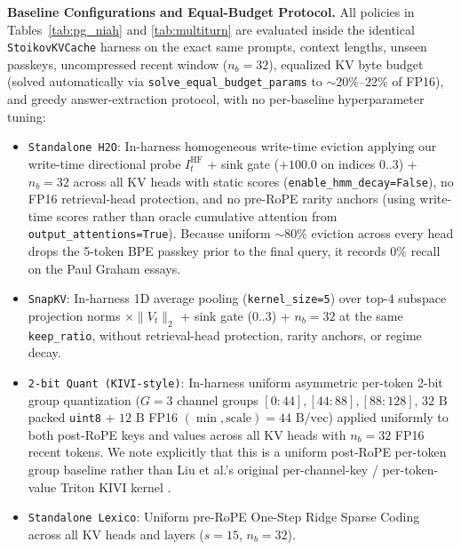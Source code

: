 \documentclass[conference]{IEEEtran}
\begin{document}
\textbf{Baseline Configurations and Equal-Budget Protocol.} All policies in Tables~\ref{tab:pg_niah} and \ref{tab:multiturn} are evaluated inside the identical \texttt{StoikovKVCache} harness on the exact same prompts, context lengths, unseen passkeys, uncompressed recent window ($n_b = 32$), equalized KV byte budget (solved automatically via \texttt{solve\_equal\_budget\_params} to $\sim 20\%$--$22\%$ of FP16), and greedy answer-extraction protocol, with no per-baseline hyperparameter tuning:
\begin{itemize}
    \item \texttt{Standalone H2O}: In-harness homogeneous write-time eviction applying our write-time directional probe $I_t^{\text{HF}}$ + sink gate ($+100.0$ on indices $0..3$) + $n_b = 32$ across all KV heads with static scores (\texttt{enable\_hmm\_decay=False}), no FP16 retrieval-head protection, and no pre-RoPE rarity anchors (using write-time scores rather than oracle cumulative attention from \texttt{output\_attentions=True}). Because uniform $\sim 80\%$ eviction across every head drops the 5-token BPE passkey prior to the final query, it records $0\%$ recall on the Paul Graham essays.
    \item \texttt{SnapKV}: In-harness 1D average pooling (\texttt{kernel\_size=5}) over top-$4$ subspace projection norms $\times \|V_t\|_2$ + sink gate ($0..3$) + $n_b = 32$ at the same \texttt{keep\_ratio}, without retrieval-head protection, rarity anchors, or regime decay.
    \item \texttt{2-bit Quant (KIVI-style)}: In-harness uniform asymmetric per-token 2-bit group quantization ($G = 3$ channel groups $[0{:}44], [44{:}88], [88{:}128]$, $32\text{ B}$ packed \texttt{uint8} + $12\text{ B}$ FP16 $(\min, \text{scale}) = 44\text{ B/vec}$) applied uniformly to both post-RoPE keys and values across all KV heads with $n_b = 32$ FP16 recent tokens. We note explicitly that this is a uniform post-RoPE per-token group baseline rather than Liu et al.'s original per-channel-key / per-token-value Triton KIVI kernel \cite{b6}.
    \item \texttt{Standalone Lexico}: Uniform pre-RoPE One-Step Ridge Sparse Coding across all KV heads and layers ($s = 15$, $n_b = 32$).
\end{itemize}
\end{document}
